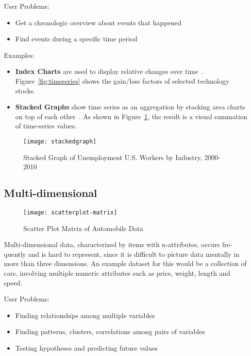 \begin{english}
\SuperPar User Problems:

\begin{itemize}
\item Get a chronologic overview about events that happened
\item Find events during a specific time period
\end{itemize}

\SuperPar Examples:

\begin{itemize}
\item \textbf{Index Charts} are used to display relative changes over time~\cite{VisualizationZoo:2010}. Figure~\ref{fig:timeseries} shows the gain/loss factors of selected technology stocks.
\item \textbf{Stacked Graphs} show time series as an aggregation by stacking area charts on top of each other~\cite{VisualizationZoo:2010}. As shown in Figure~\ref{fig:stackedgraph}, the result is a visual summation of time-series values.
\end{itemize}


\begin{figure}
\centering
\texttt{[image: stackedgraph]}
\caption{Stacked Graph of Unemployment U.S. Workers by Industry, 2000-2010}
\label{fig:stackedgraph}
\end{figure}


\subsection{Multi-dimensional}

\begin{figure}
\centering
\texttt{[image: scatterplot-matrix]}
\caption{Scatter Plot Matrix of Automobile Data}
\label{fig:scatterplot-matrix}
\end{figure}

Multi-dimensional data, characterized by items with n-attributes, occurs frequently and is hard to represent, since it is difficult to picture data mentally in more than three dimensions. An example dataset for this would be a collection of cars, involving multiple numeric attributes such as price, weight, length and speed.

\SuperPar User Problems:

\begin{itemize}
  \item Finding relationships among multiple variables
  \item Finding patterns, clusters, correlations among pairs of variables
  \item Testing hypotheses and predicting future values
\end{itemize}



\end{english}
